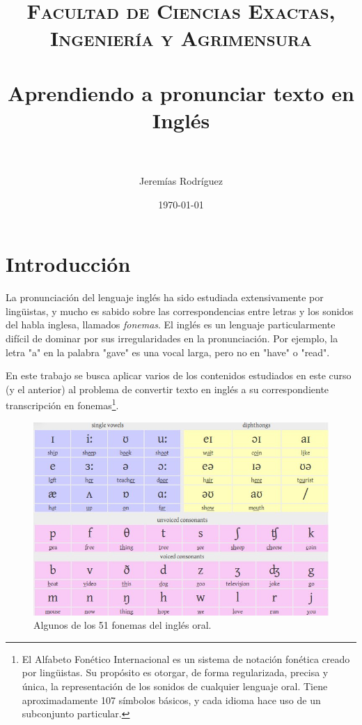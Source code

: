 \documentclass[paper=a4, fontsize=11pt]{scrartcl} %
\title{   
\normalfont \normalsize 
\textsc{Facultad de Ciencias Exactas, Ingeniería y Agrimensura} \\ [25pt] %
\horrule{0.5pt} \\[0.4cm] %
\huge Aprendiendo a pronunciar texto en Inglés \\ %
\horrule{2pt} \\[0.5cm] %
}
\author{Jeremías Rodríguez} %
\date{\normalsize\today} %
\numberwithin{equation}{section} %
\numberwithin{figure}{section} %
\numberwithin{table}{section} %
\begin{document}
\maketitle %


\section{Introducción}

\par La pronunciación del lenguaje inglés ha sido estudiada extensivamente por lingüistas, y mucho es sabido sobre las correspondencias entre letras y los sonidos del habla inglesa, llamados \emph{fonemas}.  El inglés es un lenguaje particularmente difícil de dominar por sus irregularidades en la pronunciación. Por ejemplo, la letra "a" en la palabra "gave" es una vocal larga,  pero no en "have" o "read".\\
\par En este trabajo se busca aplicar varios de los contenidos estudiados en este curso (y el anterior) al problema de convertir texto en inglés a su correspondiente transcripción en fonemas\footnote{El Alfabeto Fonético Internacional es un sistema de notación fonética creado por lingüistas. Su propósito es otorgar, de forma regularizada, precisa y única, la representación de los sonidos de cualquier lenguaje oral. Tiene aproximadamente 107 símbolos básicos, y cada idioma hace uso de un subconjunto particular.}. \\

\begin{figure}[h!]
\centering
\includegraphics[width=120mm]{imgs/phonemicChart.jpg}
\caption{Algunos de los 51 fonemas del inglés oral.}
\label{fig:method}
\end{figure}
\end{document}

